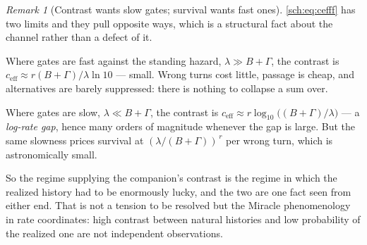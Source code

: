 \documentclass[11pt]{article}
\numberwithin{equation}{section}
\theoremstyle{plain}
\theoremstyle{definition}
\theoremstyle{remark}
\newtheorem{remark}[theorem]{Remark}
\begin{document}
\begin{remark}[Contrast wants slow gates; survival wants fast ones]
\label{sch:rem:tension}
\eqref{sch:eq:cefff} has two limits and they pull opposite ways, which
is a structural fact about the channel rather than a defect of it.

Where gates are fast against the standing hazard, $\lambda\gg B+\Gamma$,
the contrast is $c_{\mathrm{eff}}\approx r(B+\Gamma)/\lambda\ln10$ ---
small. Wrong turns cost little, passage is cheap, and alternatives are
barely suppressed: there is nothing to collapse a sum over.

Where gates are slow, $\lambda\ll B+\Gamma$, the contrast is
$c_{\mathrm{eff}}\approx r\log_{10}\bigl((B+\Gamma)/\lambda\bigr)$ --- a
\emph{log-rate gap}, hence many orders of magnitude whenever the gap is
large. But the same slowness prices survival at
$(\lambda/(B+\Gamma))^{\,r}$ per wrong turn, which is astronomically
small.

So the regime supplying the companion's contrast is the regime in which
the realized history had to be enormously lucky, and the two are one
fact seen from either end. That is not a tension to be resolved but the
Miracle phenomenology in rate coordinates: high contrast between natural
histories and low probability of the realized one are not independent
observations.
\end{remark}
\end{document}
